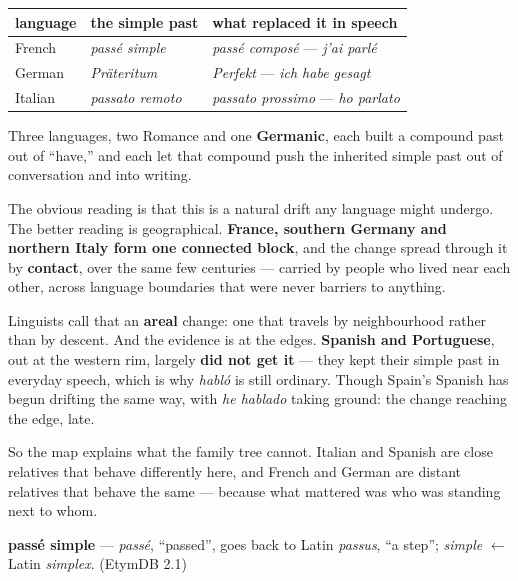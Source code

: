 \begin{culture}
\noindent
\begin{tabularx}{\linewidth}{@{}>{\raggedright\arraybackslash}X>{\raggedright\arraybackslash}X>{\raggedright\arraybackslash}X@{}}
\toprule
\textbf{language} & \textbf{the simple past} & \textbf{what replaced it in speech} \\
\midrule
French & \emph{passé simple} & \emph{passé composé} — \emph{j'ai parlé} \\
German & \emph{Präteritum} & \emph{Perfekt} — \emph{ich habe gesagt} \\
Italian & \emph{passato remoto} & \emph{passato prossimo} — \emph{ho parlato} \\
\bottomrule
\end{tabularx}

Three languages, two Romance and one \textbf{Germanic}, each built a compound past out of \textquotedblleft{}have,\textquotedblright{} and each let that compound push the inherited simple past out of conversation and into writing.

The obvious reading is that this is a natural drift any language might undergo. The better reading is geographical. \textbf{France, southern Germany and northern Italy form one connected block}, and the change spread through it by \textbf{contact}, over the same few centuries — carried by people who lived near each other, across language boundaries that were never barriers to anything.

Linguists call that an \textbf{areal} change: one that travels by neighbourhood rather than by descent. And the evidence is at the edges. \textbf{Spanish and Portuguese}, out at the western rim, largely \textbf{did not get it} — they kept their simple past in everyday speech, which is why \emph{habló} is still ordinary. Though Spain's Spanish has begun drifting the same way, with \emph{he hablado} taking ground: the change reaching the edge, late.

So the map explains what the family tree cannot. Italian and Spanish are close relatives that behave differently here, and French and German are distant relatives that behave the same — because what mattered was who was standing next to whom.
\end{culture}

\begin{cousinweb}
\textbf{passé simple} — \emph{passé}, \textquotedblleft{}passed\textquotedblright{}, goes back to Latin \emph{passus}, \textquotedblleft{}a step\textquotedblright{}; \emph{simple} $\leftarrow$ Latin \emph{simplex}. (EtymDB 2.1)
\end{cousinweb}

